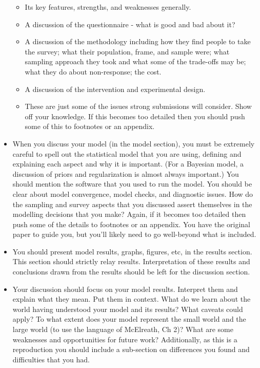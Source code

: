 \documentclass[
]{book}
\providecommand{\tightlist}{%
  \setlength{\itemsep}{0pt}\setlength{\parskip}{0pt}}
\begin{document}
\begin{itemize}
  \begin{itemize}
  \tightlist
  \item
    Its key features, strengths, and weaknesses generally.
  \item
    A discussion of the questionnaire - what is good and bad about it?
  \item
    A discussion of the methodology including how they find people to take the survey; what their population, frame, and sample were; what sampling approach they took and what some of the trade-offs may be; what they do about non-response; the cost.
  \item
    A discussion of the intervention and experimental design.
  \item
    These are just some of the issues strong submissions will consider. Show off your knowledge. If this becomes too detailed then you should push some of this to footnotes or an appendix.
  \end{itemize}
\item
  When you discuss your model (in the model section), you must be extremely careful to spell out the statistical model that you are using, defining and explaining each aspect and why it is important. (For a Bayesian model, a discussion of priors and regularization is almost always important.) You should mention the software that you used to run the model. You should be clear about model convergence, model checks, and diagnostic issues. How do the sampling and survey aspects that you discussed assert themselves in the modelling decisions that you make? Again, if it becomes too detailed then push some of the details to footnotes or an appendix. You have the original paper to guide you, but you'll likely need to go well-beyond what is included.
\item
  You should present model results, graphs, figures, etc, in the results section. This section should strictly relay results. Interpretation of these results and conclusions drawn from the results should be left for the discussion section.
\item
  Your discussion should focus on your model results. Interpret them and explain what they mean. Put them in context. What do we learn about the world having understood your model and its results? What caveats could apply? To what extent does your model represent the small world and the large world (to use the language of McElreath, Ch 2)? What are some weaknesses and opportunities for future work? Additionally, as this is a reproduction you should include a sub-section on differences you found and difficulties that you had.

\end{itemize}
\end{document}
